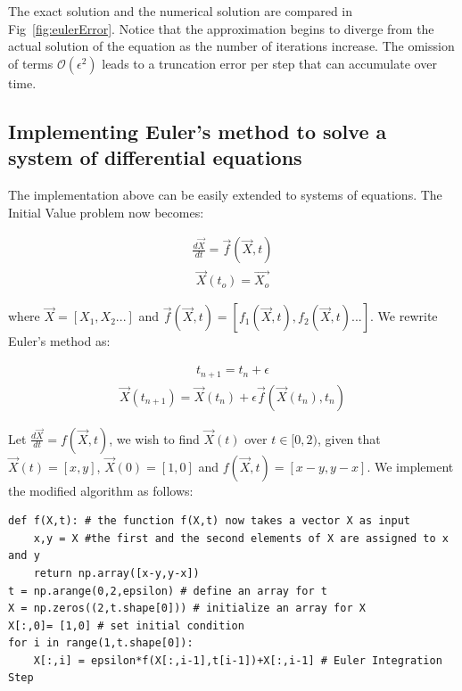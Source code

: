 \documentclass[10pt,letterpaper]{article}
\begin{document}
The exact solution and the numerical solution are compared in Fig~\ref{fig:eulerError}. Notice that the approximation begins to diverge from the actual solution of the equation as the number of iterations increase. The omission of terms $\mathcal{O}(\epsilon^2)$ leads to a truncation error per step that can accumulate over time. 

\subsection*{Implementing Euler's method to solve a system of differential equations}

The implementation above can be easily extended to systems of equations. The Initial Value problem now becomes:

\begin{eqnarray}\frac{d\vec{X}}{dt} = \vec{f}(\vec{X}, t)\end{eqnarray}
\begin{eqnarray}\vec{X}(t_o) = \vec{X_o}\end{eqnarray}

where $\vec{X}=[X_1,X_2...]$ and $\vec{f}(\vec{X}, t)=[f_1(\vec{X}, t),f_2(\vec{X}, t)...]$. We rewrite Euler's method as:

\begin{eqnarray}t_{n+1} = t_n + \epsilon \end{eqnarray}
\begin{eqnarray}\vec{X}(t_{n+1}) = \vec{X}(t_{n}) + \epsilon \vec{f}(\vec{X}(t_{n}), t_n)\end{eqnarray}

Let $\frac{d\vec{X}}{dt}=f(\vec{X},t)$, we wish to find $\vec{X}(t)$ over $t\in[0,2)$, given that $\vec{X}(t)=[x,y]$, $\vec{X}(0)=[1,0]$ and $f(\vec{X},t) = [x-y,y-x]$. We implement the modified algorithm as follows:

\begin{verbatim}
def f(X,t): # the function f(X,t) now takes a vector X as input
    x,y = X #the first and the second elements of X are assigned to x and y
    return np.array([x-y,y-x])
t = np.arange(0,2,epsilon) # define an array for t
X = np.zeros((2,t.shape[0])) # initialize an array for X
X[:,0]= [1,0] # set initial condition
for i in range(1,t.shape[0]):
    X[:,i] = epsilon*f(X[:,i-1],t[i-1])+X[:,i-1] # Euler Integration Step
\end{verbatim}
\end{document}

